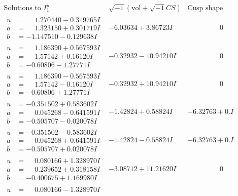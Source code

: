 \documentclass[1p]{elsarticle_modified}
\theoremstyle{definition}
\newcommand{\I}{\sqrt{-1}}
\begin{document}
$$\begin{array}{c|c|c}
\text{Solutions to }I^u_{1}& \I (\text{vol} + \sqrt{-1}CS) & \text{Cusp shape}\\
 \hline 
\begin{aligned}
u &= \phantom{-}1.270440 - 0.319765 I \\
a &= \phantom{-}1.323150 + 0.301719 I \\
b &= -1.147510 - 0.129638 I\end{aligned}
 & -6.03634 + 3.86723 I & \phantom{-0.000000 } 0 \\ \hline\begin{aligned}
u &= \phantom{-}1.186390 + 0.567593 I \\
a &= \phantom{-}1.57142 + 0.16120 I \\
b &= -0.60806 - 1.27771 I\end{aligned}
 & -0.32932 - 10.94210 I & \phantom{-0.000000 } 0 \\ \hline\begin{aligned}
u &= \phantom{-}1.186390 - 0.567593 I \\
a &= \phantom{-}1.57142 - 0.16120 I \\
b &= -0.60806 + 1.27771 I\end{aligned}
 & -0.32932 + 10.94210 I & \phantom{-0.000000 } 0 \\ \hline\begin{aligned}
u &= -0.351502 + 0.583602 I \\
a &= \phantom{-}0.045268 - 0.641591 I \\
b &= -0.505707 - 0.020078 I\end{aligned}
 & -1.42824 + 0.58824 I & -6.32763 + 0. I\phantom{ +0.000000I} \\ \hline\begin{aligned}
u &= -0.351502 - 0.583602 I \\
a &= \phantom{-}0.045268 + 0.641591 I \\
b &= -0.505707 + 0.020078 I\end{aligned}
 & -1.42824 - 0.58824 I & -6.32763 + 0. I\phantom{ +0.000000I} \\ \hline\begin{aligned}
u &= \phantom{-}0.080166 + 1.328970 I \\
a &= \phantom{-}0.239652 + 0.318158 I \\
b &= -0.400675 + 1.169980 I\end{aligned}
 & -3.08712 + 11.21620 I & \phantom{-0.000000 } 0 \\ \hline\begin{aligned}
u &= \phantom{-}0.080166 - 1.328970 I \\

\end{aligned}
\end{array}$$
\end{document}
